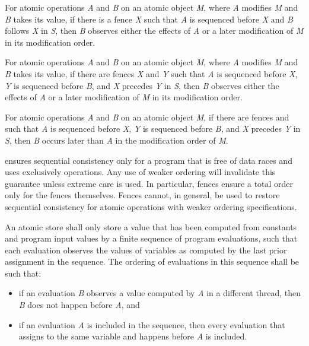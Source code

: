 \pnum
For atomic operations \textit{A} and \textit{B} on an atomic object \textit{M}, where
\textit{A} modifies \textit{M} and \textit{B} takes its value, if there is a
 fence \textit{X} such that \textit{A} is sequenced before
\textit{X} and \textit{B} follows \textit{X} in \textit{S}, then \textit{B} observes
either the effects of \textit{A} or a later modification of \textit{M} in its
modification order.

\pnum
For atomic operations \textit{A} and \textit{B} on an atomic object \textit{M}, where
\textit{A} modifies \textit{M} and \textit{B} takes its value, if there are
 fences \textit{X} and \textit{Y} such that \textit{A} is
sequenced before \textit{X}, \textit{Y} is sequenced before \textit{B}, and \textit{X}
precedes \textit{Y} in \textit{S}, then \textit{B} observes either the effects of
\textit{A} or a later modification of \textit{M} in its modification order.

\pnum
For atomic operations \textit{A} and \textit{B} on an atomic object \textit{M}, if there
are  fences  and  such that \textit{A} is
sequenced before \textit{X}, \textit{Y} is sequenced before \textit{B}, and \textit{X}
precedes \textit{Y} in \textit{S}, then \textit{B} occurs later than \textit{A} in the
modification order of \textit{M}.

\pnum
\enternote {} ensures sequential consistency only for a
program that is free of data races and uses exclusively 
operations. Any use of weaker ordering will invalidate this guarantee unless extreme
care is used. In particular,  fences ensure a total order
only for the fences themselves. Fences cannot, in general, be used to restore sequential
consistency for atomic operations with weaker ordering specifications. \exitnote

\pnum
An atomic store shall only store a value that has been computed from constants and
program input values by a finite sequence of program evaluations, such that each
evaluation observes the values of variables as computed by the last prior assignment in
the sequence. The ordering of evaluations in this sequence shall be such that:

\begin{itemize}
\item if an evaluation \textit{B} observes a value computed by \textit{A} in a
different thread, then \textit{B} does not happen before \textit{A}, and

\item if an evaluation \textit{A} is included in the sequence, then every
evaluation that assigns to the same variable and happens before \textit{A} is
included.
\end{itemize}

